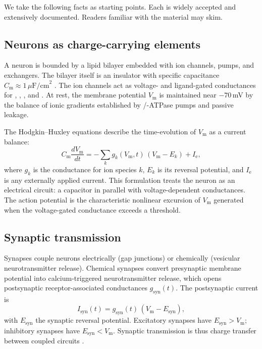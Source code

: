 \documentclass[11pt,twocolumn,a4paper]{article}
\theoremstyle{definition}
\theoremstyle{remark}
\newcommand{\Vm}{V_{\mathrm{m}}}
\newcommand{\Ie}{I_{\mathrm{e}}}
\newcommand{\Isyn}{I_{\mathrm{syn}}}
\newcommand{\gsyn}{g_{\mathrm{syn}}}
\newcommand{\Cm}{C_{\mathrm{m}}}
\begin{document}
We take the following facts as starting points. Each is widely accepted
and extensively documented. Readers familiar with the material may skim.

\subsection{Neurons as charge-carrying elements}

A neuron is bounded by a lipid bilayer embedded with ion channels,
pumps, and exchangers. The bilayer itself is an insulator with
specific capacitance $\Cm \approx 1\,\mu\mathrm{F/cm}^2$
\citep{hodgkin1952,kandel2013}. The ion channels act as voltage- and
ligand-gated conductances for , , , and
. At rest, the membrane potential $\Vm$ is maintained near
$-70$\,mV by the balance of ionic gradients established by
/-ATPase pumps and passive leakage.

The Hodgkin--Huxley equations \citep{hodgkin1952} describe the
time-evolution of $\Vm$ as a current balance:
\begin{equation}
\Cm \frac{d \Vm}{dt} = -\sum_k g_k(\Vm, t)\,(\Vm - E_k) + \Ie,
\label{eq:hh}
\end{equation}
where $g_k$ is the conductance for ion species $k$, $E_k$ is its
reversal potential, and $\Ie$ is any externally applied current. This
formulation treats the neuron as an electrical circuit: a capacitor in
parallel with voltage-dependent conductances. The action potential is
the characteristic nonlinear excursion of $\Vm$ generated when the
voltage-gated  conductance exceeds a threshold.

\subsection{Synaptic transmission}

Synapses couple neurons electrically (gap junctions) or chemically
(vesicular neurotransmitter release). Chemical synapses convert
presynaptic membrane potential into calcium-triggered neurotransmitter
release, which opens postsynaptic receptor-associated conductances
$\gsyn(t)$. The postsynaptic current is
\begin{equation}
\Isyn(t) = \gsyn(t) \,(\Vm - E_{\mathrm{syn}}),
\label{eq:syn-current}
\end{equation}
with $E_{\mathrm{syn}}$ the synaptic reversal potential. Excitatory
synapses have $E_{\mathrm{syn}} > \Vm$; inhibitory synapses have
$E_{\mathrm{syn}} < \Vm$. Synaptic transmission is thus charge
transfer between coupled circuits \citep{katz1967,katz1972}.
\end{document}
